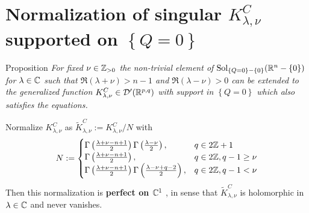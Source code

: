 \documentclass[8pt,pdf,notes]{beamer}
\newcommand{\Sol}{\mbox{Sol}}
\newcommand{\D}{\mathcal{D}}
\newenvironment{prop}{\begin{exampleblock}{Proposition}\it}{\end{exampleblock}}
\theoremstyle{mystyle}
\begin{document}
\section{Normalization of singular ${K}^C_{ \lambda,\nu }$ supported on $\left\{ Q=0 \right\}$}
\begin{frame}
\begin{prop}
	For fixed $\nu\in\mathbb{Z}_{ >0 }$
	the non-trivial element of $\Sol_{\mycbra{Q=0}-\mycbra{0}}(\R^n-\mycbra{0})$ for $\lambda\in\mathbb{C}$ such that 
	$\Re(\lambda+\nu)>n-1$ and $\Re(\lambda-\nu)>0$ can be extended to the generalized function 
	$K_{\lambda,\nu}^C\in\D'(\R^{p,q})$ with support in $\left\{ Q=0 \right\}$ which also satisfies the equations.
\end{prop}
\begin{theorem}[$O(p+1,q+1),\;n:=p+q$]
	Normalize $K^C_{ \lambda,\nu }$ as $\tilde{K}^C_{\lambda,\nu}:=K^C_{\lambda,\nu}/N$ with\[
		N:=\begin{cases}
		\Gamma\left( \frac{\lambda+\nu-n+1}{2} \right)\Gamma\left( \frac{\lambda-\nu}{2} \right),&q\in2\mathbb{Z}+1\\
		\Gamma\left( \frac{\lambda+\nu-n+1}{2} \right),&q\in2\mathbb{Z},q-1\ge\nu\\
		\Gamma\left( \frac{\lambda+\nu-n+1}{2} \right)\Gamma\left( \frac{\lambda-\nu+q-2}{2} \right),&q\in2\mathbb{Z},q-1<\nu\\
		\end{cases}
	\]
	Then this normalization is {\bf perfect on $\mathbb{C}^1$}
	, in sense that $\tilde{K}_{\lambda,\nu}^C$ is holomorphic in $\lambda\in\mathbb{C}$ and
	never vanishes.
\end{theorem}
\end{frame}
\end{document}
